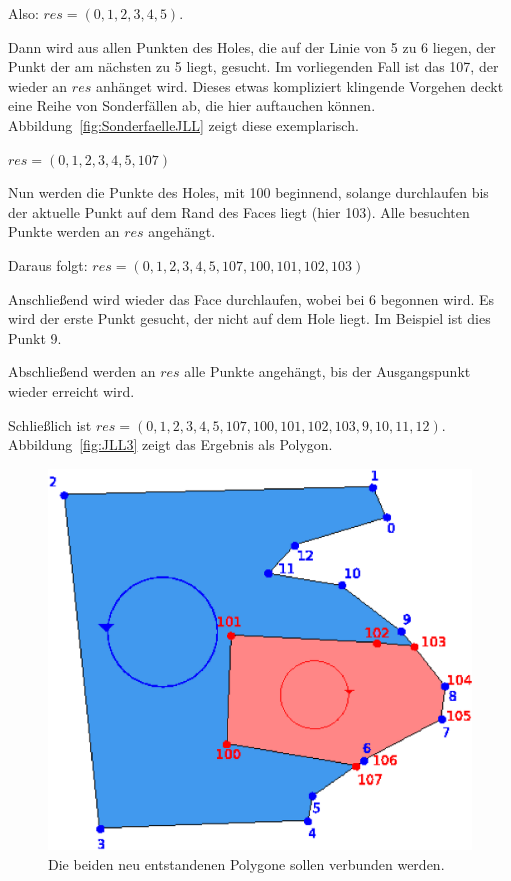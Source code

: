 Also: $res=(0, 1, 2, 3, 4, 5)$.

Dann wird aus allen Punkten des Holes, die auf der Linie von 5 zu 6 liegen, der Punkt der am nächsten zu 5 liegt,  gesucht. Im vorliegenden Fall ist das 107, der wieder an $res$ anhänget wird. Dieses etwas kompliziert klingende Vorgehen deckt eine Reihe von Sonderfällen ab, die hier auftauchen können. Abbildung~\vref{fig:SonderfaelleJLL} zeigt diese exemplarisch.

$res=(0, 1, 2, 3, 4, 5, 107)$

Nun werden die Punkte des Holes,  mit 100 beginnend, solange durchlaufen bis der aktuelle Punkt auf dem Rand des Faces liegt (hier 103). Alle besuchten Punkte werden an $res$ angehängt.

Daraus folgt: $res=(0, 1, 2, 3, 4, 5, 107, 100, 101, 102, 103)$

Anschließend wird wieder das Face durchlaufen, wobei bei 6 begonnen wird. Es wird  der erste Punkt  gesucht, der nicht auf dem Hole liegt. Im Beispiel ist dies Punkt 9.

Abschließend werden an $res$ alle Punkte angehängt, bis der Ausgangspunkt wieder erreicht wird.

Schließlich ist $res=(0, 1, 2, 3, 4, 5, 107, 100, 101, 102, 103, 9, 10, 11, 12)$. Abbildung~\vref{fig:JLL3} zeigt das Ergebnis als Polygon.


\begin{figure}
	\centering
	\includegraphics[scale=0.6]{JLL2.svg.eps}
	\caption{Die beiden neu entstandenen Polygone sollen verbunden werden.}
	\label{fig:JLL2}
\end{figure}


